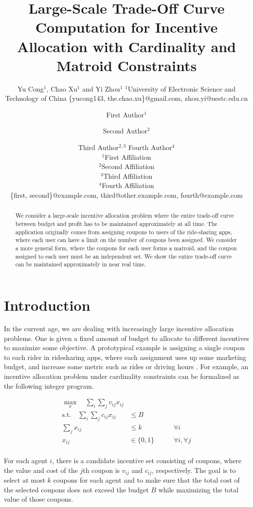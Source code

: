 \documentclass{article}
\title{Large-Scale Trade-Off Curve Computation for Incentive Allocation with Cardinality and Matroid Constraints}
\author{
Yu Cong$^1$, Chao Xu$^1$ and Yi Zhou$^1$
\affiliations
$^1$University of Electronic Science and Technology of China
\emails
\{yucong143, the.chao.xu\}@gmail.com, zhou.yi@uestc.edu.cn
}
\author{
First Author$^1$
\and
Second Author$^2$\and
Third Author$^{2,3}$\And
Fourth Author$^4$\\
\affiliations
$^1$First Affiliation\\
$^2$Second Affiliation\\
$^3$Third Affiliation\\
$^4$Fourth Affiliation\\
\emails
\{first, second\}@example.com,
third@other.example.com,
fourth@example.com
}
\begin{document}
\maketitle
\begingroup
\renewcommand{\thefootnote}{}
\endgroup

\begin{abstract}
    We consider a large-scale incentive allocation problem where the entire trade-off curve between budget and profit has to be maintained approximately at all time. 
    The application originally comes from assigning coupons to users of the ride-sharing apps, where each user can have a limit on the number of coupons been assigned. We consider a more general form, where the coupons for each user forms a matroid, and the coupon assigned to each user must be an independent set. We show the entire trade-off curve can be maintained approximately in near real time.
  \end{abstract}

  \section{Introduction}


In the current age, we are dealing with increasingly large incentive allocation problems. One is given a fixed amount of budget to allocate to different incentives to maximize some objective. A prototypical example is assigning a single coupon to each rider in ridesharing apps, where each assignment uses up some marketing budget, and increase some metric such as rides or driving hours \cite{wang_shmoys_2019}. For example, an incentive allocation problem under cardinality constraints can be formalized as the following integer program.

\begin{align*}
    \max_x \quad \sum_{i}\sum_{j} v_{ij}x_{ij}\\
    \text{s.t.}   \quad \sum_{i}\sum_{j} c_{ij}x_{ij} &\leq B\\
    \sum_j x_{ij}&\leq k\phantom{\in \{0,1\}} \quad \forall i\\
    x_{ij}&\in \{0,1\}\phantom{\leq k} \quad \forall i, \forall j\\
\end{align*}

For each agent $i$, there is a candidate incentive set consisting of coupons, where the value and cost of the $j$th coupon is $v_{ij}$ and $c_{ij}$, respectively. The goal is to select at most $k$ coupons for each agent and to make sure that the total cost of the selected coupons does not exceed the budget $B$ while maximizing the total value of those coupons.
\end{document}
